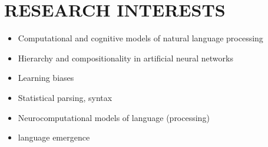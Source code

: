 \section{RESEARCH INTERESTS}

\begin{itemize}
    \item Computational and cognitive models of natural language processing
    \item Hierarchy and compositionality in artificial neural networks
    \item Learning biases
    \item Statistical parsing, syntax
    \item Neurocomputational models of language (processing)
    \item language emergence
\end{itemize}
